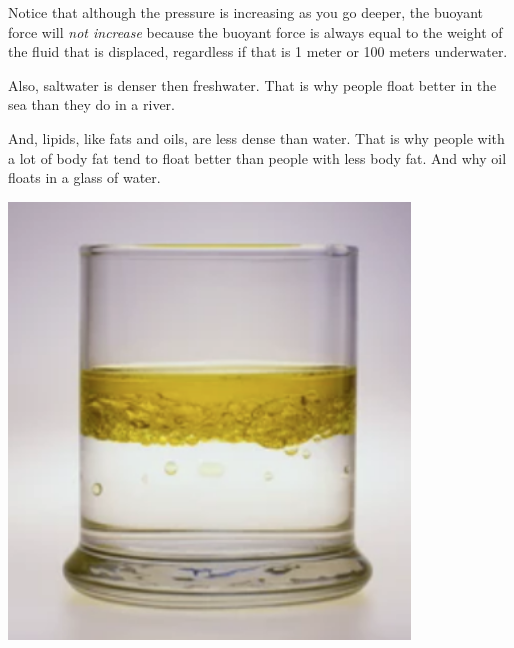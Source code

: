 Notice that although the pressure is increasing as you go deeper, the
buoyant force will \emph{not increase} because the buoyant force is always equal
to the weight of the fluid that is displaced, regardless if that is 1
meter or 100 meters underwater.

Also, saltwater is denser then freshwater. That is why people float
better in the sea than they do in a river.

And, lipids, like fats and oils, are less dense than water. That is why
people with a lot of body fat tend to float better than people with
less body fat. And why oil floats in a glass of water.

\includegraphics[width=0.8\textwidth]{Oil_Water.png}


